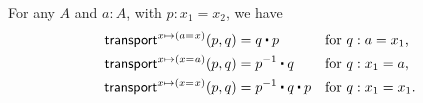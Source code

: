 \documentclass[hott-all.tex]{subfiles}
\begin{document}
%
%
%
\begin{lem}\label{cor:transport-path-prepost}
  For any $A$ and $a:A$, with $p:x_1=x_2$, we have
  \begin{align*}
    \transfib{x \mapsto (\id{a}{x})} {p} {q} &= q \ct p
    & &\text{for $q:a=x_1$,}\\
    \transfib{x \mapsto (\id{x}{a})} {p} {q} &= \opp {p} \ct q
    & &\text{for $q:x_1=a$,}\\
    \transfib{x \mapsto (\id{x}{x})} {p} {q} &= \opp{p} \ct q \ct p
    & &\text{for $q:x_1=x_1$.}
  \end{align*}
\end{lem}
%
%
\end{document}
